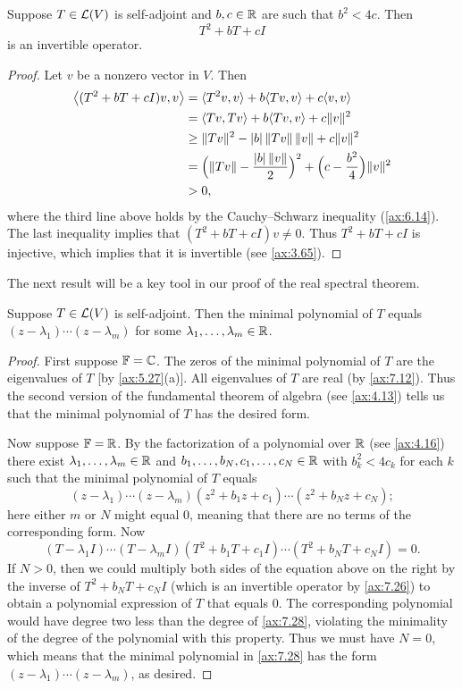 \begin{result}\label{ax:7.26}
Suppose $T\in\mathcal{L}(V)$ is self-adjoint and $b,c\in\mathbb{R}$ are such that $b^2<4c$.
Then
\[ T^2+bT+cI \]
is an invertible operator.
\end{result}

\begin{proof}
Let $v$ be a nonzero vector in $V$. Then
\begin{align*}
\bigl\langle (T^2+bT+cI)v,v\bigr\rangle
  &= \langle T^2v, v \rangle+b\langle Tv, v \rangle+c\langle v, v \rangle\\
  &= \langle Tv, Tv \rangle+b\langle Tv, v \rangle+c\lVert v \rVert^2\\
  &\ge \lVert Tv \rVert^2-\lvert b \rvert\,\lVert Tv \rVert\,\lVert v \rVert+c\lVert v \rVert^2\\
  &= \Bigl(\lVert Tv \rVert-\frac{\lvert b \rvert\,\lVert v \rVert}{2}\Bigr)^2
     +\Bigl(c-\frac{b^2}{4}\Bigr)\lVert v \rVert^2\\
  &> 0,
\end{align*}
where the third line above holds by the Cauchy--Schwarz inequality
(\ref{ax:6.14}). The last inequality implies that $(T^2+bT+cI)v\ne0$. Thus
$T^2+bT+cI$ is injective, which implies that it is invertible (see
\ref{ax:3.65}).
\end{proof}

The next result will be a key tool in our proof of the real spectral theorem.

\begin{result}\label{ax:7.27}
Suppose $T\in\mathcal{L}(V)$ is self-adjoint. Then the minimal polynomial of $T$
equals $(z-\lambda_1)\cdots(z-\lambda_m)$ for some
$\lambda_1,\dots,\lambda_m\in\mathbb{R}$.
\end{result}

\begin{proof}
First suppose $\mathbb{F}=\mathbb{C}$. The zeros of the minimal polynomial of $T$ are the
eigenvalues of $T$ [by \ref{ax:5.27}(a)]. All eigenvalues of $T$ are real (by
\ref{ax:7.12}). Thus the second version of the fundamental theorem of algebra
(see \ref{ax:4.13}) tells us that the minimal polynomial of $T$ has the desired
form.

Now suppose $\mathbb{F}=\mathbb{R}$. By the factorization of a polynomial over $\mathbb{R}$ (see
\ref{ax:4.16}) there exist $\lambda_1,\dots,\lambda_m\in\mathbb{R}$ and
$b_1,\dots,b_N,c_1,\dots,c_N\in\mathbb{R}$ with $b_k^2<4c_k$ for each $k$ such that the
minimal polynomial of $T$ equals
\[ (z-\lambda_1)\cdots(z-\lambda_m)(z^2+b_1z+c_1)\cdots(z^2+b_Nz+c_N);
   \tag{\thetheorem} \]
here either $m$ or $N$ might equal $0$, meaning that there are no terms of the
corresponding form. Now
\[ (T-\lambda_1I)\cdots(T-\lambda_mI)(T^2+b_1T+c_1I)\cdots(T^2+b_NT+c_NI) = 0. \]
If $N>0$, then we could multiply both sides of the equation above on the right
by the inverse of $T^2+b_NT+c_NI$ (which is an invertible operator by
\ref{ax:7.26}) to obtain a polynomial expression of $T$ that equals $0$. The
corresponding polynomial would have degree two less than the degree of
\ref{ax:7.28}, violating the minimality of the degree of the polynomial with
this property. Thus we must have $N=0$, which means that the minimal polynomial
in \ref{ax:7.28} has the form $(z-\lambda_1)\cdots(z-\lambda_m)$, as desired.
\end{proof}

